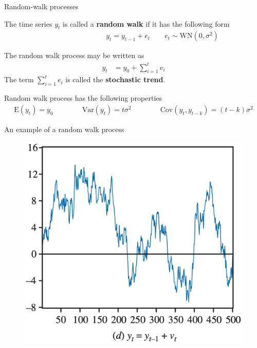 \documentclass[10pt,aspectratio=169]{beamer}  %
\begin{document}

\begin{frame}{Random-walk processes}

    \bigskip
    The time series $ y_{t} $ is called a \textbf{random walk} if it has the following form
    \begin{align*}
        \qquad\qquad\qquad\qquad y_{t} = y_{t-1} + e_{t} \qquad e_{t} \sim \text{WN} \left( 0, \sigma^{2} \right)
    \end{align*}

    The random walk process may be written as
    \begin{align*}
        y_{t} & = y_{0} + \sum_{i=1}^{t} e_{i}
    \end{align*}
    The term $ \sum_{i=1}^{t} e_{i} $ is called the \textbf{stochastic trend}.

    \medskip
    Random walk process has the following properties
    \begin{align*}
        \mathrm{E} \left( y_{t} \right) = y_{0} \qquad\qquad \mathrm{Var} \left( y_{t} \right) = t \sigma^{2} \qquad\qquad \mathrm{Cov} \left( y_{t}, y_{t-k} \right) = \left( t-k \right) \sigma^{2}
    \end{align*}

\end{frame}


\begin{frame}{An example of a random walk process}

    \bigskip
    \begin{figure}[H]
        \centering
        \includegraphics[height=0.5\textwidth]{./fig/random-walk.png}
    \end{figure}

\end{frame}
\end{document}
